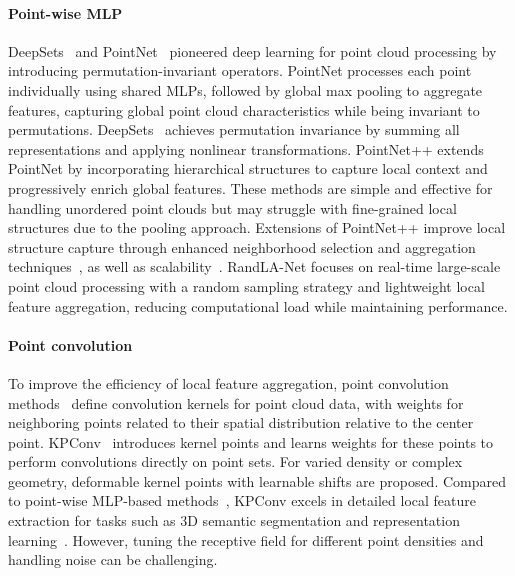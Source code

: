 \paragraph{Point-wise MLP}
DeepSets~\cite{zaheer2017deep} and PointNet~\cite{qi2017pointnet} pioneered deep learning for point cloud processing by introducing permutation-invariant operators. PointNet processes each point individually using shared MLPs, followed by global max pooling to aggregate features, capturing global point cloud characteristics while being invariant to permutations. DeepSets~\cite{zaheer2017deep} achieves permutation invariance by summing all representations and applying nonlinear transformations. PointNet++\cite{qi2017pointnet++} extends PointNet by incorporating hierarchical structures to capture local context and progressively enrich global features. These methods are simple and effective for handling unordered point clouds but may struggle with fine-grained local structures due to the pooling approach. Extensions of PointNet++ improve local structure capture through enhanced neighborhood selection and aggregation techniques~\cite{wang2019dynamic}, as well as scalability~\cite{NEURIPS2022_9318763d}. RandLA-Net\cite{hu2020randla} focuses on real-time large-scale point cloud processing with a random sampling strategy and lightweight local feature aggregation, reducing computational load while maintaining performance.

\paragraph{Point convolution}
To improve the efficiency of local feature aggregation, point convolution methods~\cite{li2018pointcnn,wu2019pointconv,thomas2019kpconv} define convolution kernels for point cloud data, with weights for neighboring points related to their spatial distribution relative to the center point. KPConv~\cite{thomas2019kpconv} introduces kernel points and learns weights for these points to perform convolutions directly on point sets. For varied density or complex geometry, deformable kernel points with learnable shifts are proposed. Compared to point-wise MLP-based methods~\cite{qi2017pointnet,qi2017pointnet++}, KPConv excels in detailed local feature extraction for tasks such as 3D semantic segmentation and representation learning~\cite{bai2020d3feat}. However, tuning the receptive field for different point densities and handling noise can be challenging.

